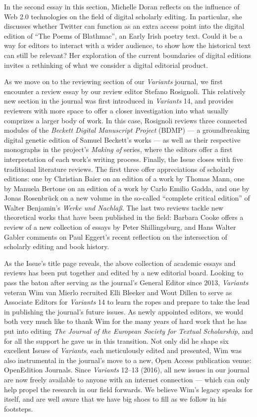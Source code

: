 \begin{preface}
In the second essay in this section, Michelle Doran reflects on the influence of Web 2.0 technologies on the field of digital scholarly editing. In particular, she discusses whether Twitter can function as an extra access point into the digital edition of ``The Poems of Blathmac'', an Early Irish poetry text. Could it be a way for editors to interact with a wider audience, to show how the historical text can still be relevant? Her exploration of the current boundaries of digital editions invites a rethinking of what we consider a digital editorial product.

As we move on to the reviewing section of our \emph{Variants} journal, we first encounter a review essay by our review editor Stefano Rosignoli. 
This relatively new section in the journal was first introduced in \emph{Variants} 14, and provides reviewers with more space to offer a closer investigation into what usually comprizes a larger body of work. 
In this case, Rosignoli reviews three connected modules of the \emph{Beckett Digital Manuscript Project} (BDMP) --- a groundbreaking digital genetic edition of Samuel Beckett's works --- as well as their respective monographs in the project's \emph{Making of} series, where the editors offer a first interpretation of each work's writing process. 
Finally, the Issue closes with five traditional literature reviews. 
The first three offer appreciations of scholarly editions: one by Christian Baier on an edition of a work by Thomas Mann, one by Manuela Bertone on an edition of a work by Carlo Emilio Gadda, and one by Jonas Rosenbrück on a new volume in the so-called ``complete critical edition'' of Walter Benjamin's \emph{Werke und Nachlaß}.
The last two reviews tackle new theoretical works that have been published in the field: Barbara Cooke offers a review of a new collection of essays by Peter Shillingsburg, and Hans Walter Gabler comments on Paul Eggert's recent reflection on the intersection of scholarly editing and book history.  

As the Issue's title page reveals, the above collection of academic essays and reviews has been put together and edited by a new editorial board. 
Looking to pass the baton after serving as the journal's General Editor since 2013, \emph{Variants} veteran Wim van Mierlo recruited Elli Bleeker and Wout Dillen to serve as Associate Editors for \emph{Variants} 14 to learn the ropes and prepare to take the lead in publishing the journal's future issues. 
As newly appointed editors, we would both very much like to thank Wim for the many years of hard work that he has put into editing \emph{The Journal of the European Society for Textual Scholarship}, and for all the support he gave us in this transition. 
Not only did he shape six excellent Issues of \emph{Variants}, each meticulously edited and presented, Wim was also instrumental in the journal's move to a new, Open Access publication venue: OpenEdition Journals. 
Since \emph{Variants} 12--13 (2016), all new issues in our journal are now freely available to anyone with an internet connection --- which can only help propel the research in our field forwards.
We believe Wim's legacy speaks for itself, and are well aware that we have big shoes to fill as we follow in his footsteps. 


\end{preface}

